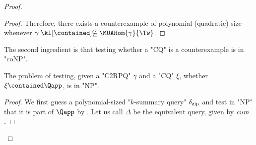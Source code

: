 \begin{proof}
\begin{proof}
	Therefore, there exists a counterexample of polynomial (quadratic) size whenever $\gamma \notcontained \MUAHom{\gamma}{\Tw}$.
  \end{proof}
  The second ingredient is that testing whether a "CQ" is a counterexample is in "coNP".

  \begin{claim}\AP\label{claim:cq-in-Qapp-np}
    The problem of testing, given a "C2RPQ" $\gamma$ and a "CQ" $\xi$, whether $\xi \contained \Qapp$, is in "NP".
  \end{claim}
  \begin{proof}
        We first guess a polynomial-sized "$k$-summary query" $\delta_{\textup{zip}}$ and test in "NP" that it is part of $\Qapp$ by . 
        Let us call $\Delta$ be the equivalent {\UCRPQSRE} query, given by  \textit{cum} .

\end{proof}
\end{proof}
